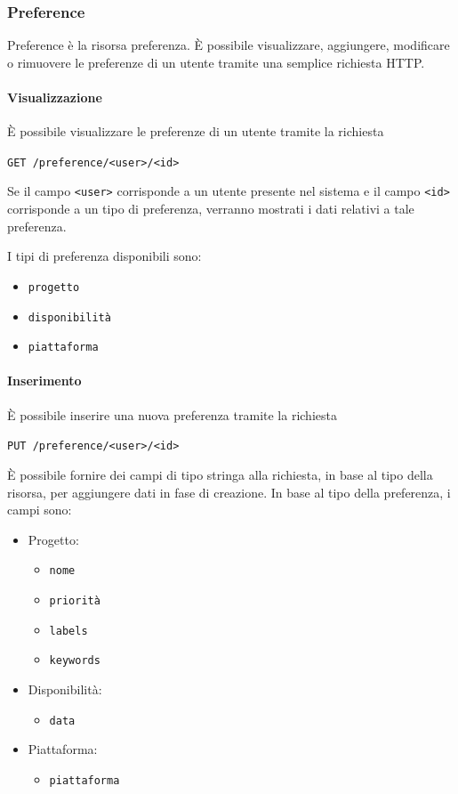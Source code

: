\subsubsection{Preference}
Preference è la risorsa preferenza. È possibile visualizzare, aggiungere, modificare o rimuovere le preferenze di un utente tramite una semplice richiesta HTTP.

\paragraph{Visualizzazione}
È possibile visualizzare le preferenze di un utente tramite la richiesta
    \begin{center}
        \texttt{GET  /preference/<user>/<id>}
    \end{center}
Se il campo \texttt{<user>} corrisponde a un utente presente nel sistema e il campo \texttt{<id>} corrisponde a un tipo di preferenza, verranno mostrati i dati relativi a tale preferenza.

I tipi di preferenza disponibili sono:
\begin{itemize}[noitemsep]
    \item \texttt{progetto}
    \item \texttt{disponibilità}
    \item \texttt{piattaforma}
\end{itemize}

\paragraph{Inserimento}
È possibile inserire una nuova preferenza tramite la richiesta
    \begin{center}
        \texttt{PUT /preference/<user>/<id>}
    \end{center}

È possibile fornire dei campi di tipo stringa alla richiesta, in base al tipo della risorsa, per aggiungere dati in fase di creazione.
In base al tipo della preferenza, i campi sono:
\begin{itemize}[noitemsep]
    \item Progetto:
        \begin{itemize}[noitemsep]
            \item \texttt{nome}
            \item \texttt{priorità}
            \item \texttt{labels}
            \item \texttt{keywords}
        \end{itemize}
    \item Disponibilità:
        \begin{itemize}[noitemsep]
            \item \texttt{data}
        \end{itemize}
    \item Piattaforma:
        \begin{itemize}[noitemsep]
            \item \texttt{piattaforma}
        \end{itemize}
\end{itemize}


